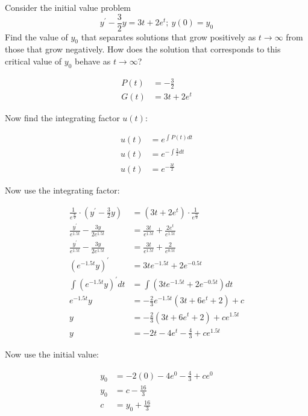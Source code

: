 \documentclass{lapchomework}
\begin{document}
\begin{problems}
\pagebreak

\problem [21] Consider the initial value problem 
$$y^{\prime}-\frac{3}{2}y=3t+2e^{t};\: y(0)=y_0$$ Find the value of $y_0$ that 
separates solutions that grow positively as $t \to \infty$ from those 
that grow negatively. How does the solution that corresponds to this critical 
value of $y_0$ behave as $t \to \infty$?

\begin{solution}

\step \begin{align*}
P(t) & = -\frac{3}{2} \\
G(t) & = 3t + 2e^t 
\end{align*}

\step Now find the integrating factor $u(t)$:

\step \begin{align*}
u(t) & = e^{\int P(t) dt} \\
u(t) & = e^{- \int \frac{3}{2} dt} \\
u(t) & = e^{- \frac{3t}{2}}
\end{align*}

\step Now use the integrating factor:

\step \begin{align*}
\frac{1}{e^{\frac{3t}{2}}} \cdot \left(y^{\prime}-\frac{3}{2}y\right) & = 
\left(3t+2e^{t}\right) \cdot \frac{1}{e^{\frac{3t}{2}}}\\
\frac{y^{\prime}}{e^{1.5t}} - \frac{3y}{2e^{1.5t}} & = \frac{3t}{e^{1.5t}} 
+ \frac{2e^{t}}{e^{1.5t}} \\
\frac{y^{\prime}}{e^{1.5t}} - \frac{3y}{2e^{1.5t}} & = \frac{3t}{e^{1.5t}} 
+ \frac{2}{e^{0.5t}} \\
\left(e^{-1.5t}y\right)^{\prime} & = 3te^{-1.5t} + 2e^{-0.5t} \\
\int \left(e^{-1.5t}y\right)^{\prime} dt & = \int \left(3te^{-1.5t} 
+ 2e^{-0.5t}\right) dt \\
e^{-1.5t}y & = - \frac{2}{3}e^{-1.5t} \left(3t+6e^t+2\right) + c \\
y & = - \frac{2}{3} \left(3t+6e^t+2\right) + ce^{1.5t} \\
y & = -2t - 4e^t - \frac{4}{3} + ce^{1.5t}
\end{align*}

\step Now use the initial value:

\step \begin{align*}
y_0 & = -2(0) - 4e^0 - \frac{4}{3} + ce^0 \\
y_0 & = c - \frac{16}{3} \\
c & = y_0 + \frac{16}{3} 
\end{align*}


\end{solution}
\end{problems}
\end{document}
